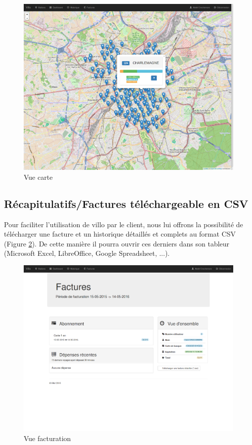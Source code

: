 \documentclass[a4paper,10pt]{article}
\begin{document}
\begin{figure}[H]
  \centering
  \includegraphics[scale=0.2]{map.png}
  \caption{\label{fig:map} Vue carte}
\end{figure}

\subsection{Récapitulatifs/Factures téléchargeable en CSV} %

Pour faciliter l'utilisation de villo par le client, nous lui offrons la possibilité
de télécharger une facture et un historique détaillés et complets au format CSV (Figure \ref{fig:factures}).
De cette manière il pourra ouvrir ces derniers dans son tableur (Microsoft Excel,
LibreOffice, Google Spreadsheet, ...).

\begin{figure}[H]
  \centering
  \includegraphics[scale=0.2]{factures.png}
  \caption{\label{fig:factures} Vue facturation}
\end{figure}
\end{document}
